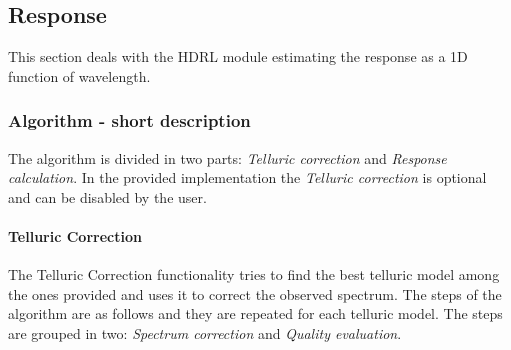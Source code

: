 \subsection{Response}
\label{response:main}

This section deals with the HDRL module estimating the response as a 1D function of wavelength.

\subsubsection{Algorithm - short description}
The algorithm is divided in two parts: \textit{Telluric correction} and \textit{Response calculation}. In the provided implementation the \textit{Telluric correction} is optional and can be disabled by the user.

\paragraph{Telluric Correction}

The Telluric Correction functionality tries to find the best telluric model among the ones provided and uses it to correct the observed spectrum.
The steps of the algorithm are as follows and they are repeated for each telluric model. The steps are grouped in two: \textit{Spectrum correction} and \textit{Quality evaluation}.

